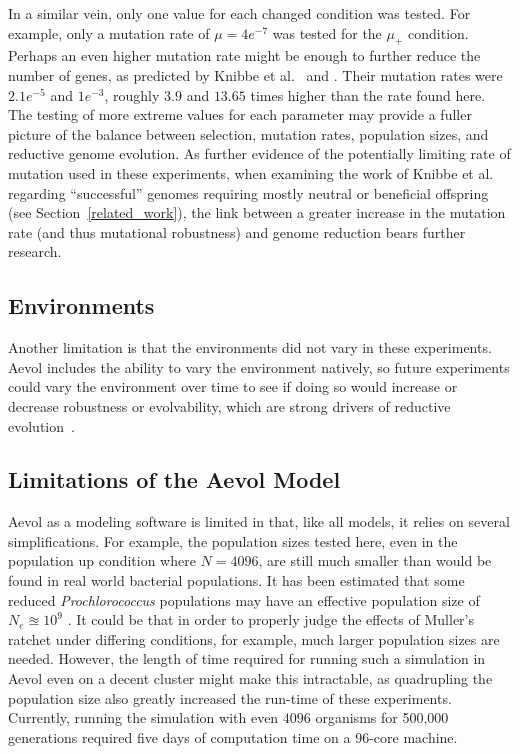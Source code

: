 In a similar vein, only one value for each changed condition was tested. For example, only a mutation rate of $\mu = 4e^{-7}$ was tested for the $\mu_+$ condition. Perhaps an even higher mutation rate might be enough to further reduce the number of genes, as predicted by Knibbe et al.~\cite{Knibbe2007} and \cite{Liard.2018}. Their mutation rates were $2.1e^{-5}$ and $1e^{-3}$, roughly $3.9$ and $13.65$ times higher than the rate found here. The testing of more extreme values for each parameter may provide a fuller picture of the balance between selection, mutation rates, population sizes, and reductive genome evolution. As further evidence of the potentially limiting rate of mutation used in these experiments, when examining the work of Knibbe et al. regarding ``successful'' genomes requiring mostly neutral or beneficial offspring (see Section~\ref{related_work}), the link between a greater increase in the mutation rate (and thus mutational robustness) and genome reduction bears further research. 

\subsection{Environments}
Another limitation is that the environments did not vary in these experiments. Aevol includes the ability to vary the environment natively, so future experiments could vary the environment over time to see if doing so would increase or decrease robustness or evolvability, which are strong drivers of reductive evolution~\cite{Batut.2013}. 

\subsection{Limitations of the Aevol Model}
Aevol as a modeling software is limited in that, like all models, it relies on several simplifications. For example, the population sizes tested here, even in the population up condition where $N = 4096$, are still much smaller than would be found in real world bacterial populations. It has been estimated that some reduced \textit{Prochlorococcus} populations may have an effective population size of $N_e \approxeq 10^9$ \cite{kashtan2014single}. It could be that in order to properly judge the effects of Muller's ratchet under differing conditions, for example, much larger population sizes are needed. However, the length of time required for running such a simulation in Aevol even on a decent cluster might make this intractable, as quadrupling the population size also greatly increased the run-time of these experiments. Currently, running the simulation with even $4096$ organisms for 500,000 generations required five days of computation time on a 96-core machine. 

